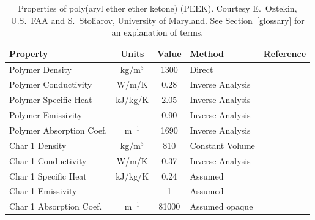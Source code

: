 \begin{table}[p]
\caption[Properties of poly(aryl ether ether ketone) (PEEK).]{Properties of poly(aryl ether ether ketone) (PEEK). Courtesy E.~Oztekin, U.S.~FAA and S.~Stoliarov,
University of Maryland. See Section~\ref{glossary} for an explanation of terms.}
\begin{center}
\begin{tabular}{|l|c|c|l|l|}
\hline
Property                    & Units         & Value                             & Method                    &  Reference                              \\ \hline \hline
Polymer Density             & kg/m$^3$      & 1300                              & Direct                    &  \cite{Oztekin:CF2012}                  \\ \hline
Polymer Conductivity        & W/m/K         & 0.28                              & Inverse Analysis          &  \cite{Oztekin:CF2012}                  \\ \hline
Polymer Specific Heat       & kJ/kg/K       & 2.05                              & Inverse Analysis          &  \cite{Oztekin:CF2012}                  \\ \hline
Polymer Emissivity          &               & 0.90                              & Inverse Analysis          &  \cite{Oztekin:CF2012}                  \\ \hline
Polymer Absorption Coef.    & m$^{-1}$      & 1690                              & Inverse Analysis          &  \cite{Oztekin:CF2012}                  \\ \hline
Char 1 Density              & kg/m$^3$      & 810                               & Constant Volume           &  \cite{Oztekin:CF2012}                  \\ \hline
Char 1 Conductivity         & W/m/K         & 0.37                              & Inverse Analysis          &  \cite{Oztekin:CF2012}                  \\ \hline
Char 1 Specific Heat        & kJ/kg/K       & 0.24                              & Assumed                   &  \cite{Oztekin:CF2012}                  \\ \hline
Char 1 Emissivity           &               & 1                                 & Assumed                   &  \cite{Oztekin:CF2012}                  \\ \hline
Char 1 Absorption Coef.     & m$^{-1}$      & 81000                             & Assumed opaque            &  \cite{Oztekin:CF2012}                  \\ \hline

\end{tabular}
\end{center}
\end{table}
